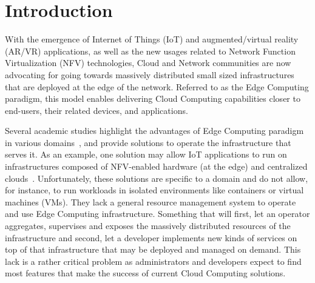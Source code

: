 
\section{Introduction}
\label{sec:intro}


With the emergence of Internet of Things (IoT) and augmented/virtual reality (AR/VR)
applications, as well as the new usages related to Network Function
Virtualization (NFV) technologies, Cloud and Network communities are now advocating
for going towards massively distributed small sized infrastructures
that are deployed at the edge of the network.
%
Referred to as the Edge Computing paradigm, this model enables delivering Cloud
Computing capabilities closer to end-users, their related devices, and applications.
%

Several academic studies highlight the advantages of Edge Computing
paradigm in various
domains~\cite{bonomi2012fog,zhang2015cloud,yi2015fog,shi2016edge,satyanarayanan2017emergence},
and provide solutions to operate the infrastructure that serves it. As
an example, one solution may allow IoT applications to run on
infrastructures composed of NFV-enabled hardware (at the edge) and
centralized clouds~\cite{bonomi2012fog}. Unfortunately, these
solutions are specific to a domain and do not allow, for instance, to
run workloads in isolated environments like containers or virtual
machines (VMs). They lack a general resource management system to
operate and use Edge Computing infrastructure. Something that will
first, let an operator aggregates, supervises and exposes the
massively distributed resources of the infrastructure and second, let
a developer implements new kinds of services on top of that
infrastructure that may be deployed and managed on demand. This lack
is a rather critical problem as administrators and developers expect
to find most features that make the success of current Cloud Computing
solutions.



